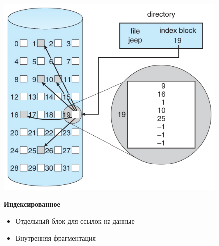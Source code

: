 \documentclass[../../lectures.tex]{subfiles}
\begin{document}
\begin{figure}[H]
\captionsetup{singlelinecheck=off}
\begin{minipage}[c]{0.5\linewidth}
\centering
\includegraphics[width=\textwidth]{images/indexed-allocation.jpg}
\end{minipage}
\hspace{0.5cm}
\begin{minipage}[c]{0.5\linewidth}
\centering
\textbf{Индексированное}
\begin{itemize}
    \item Отдельный блок для ссылок на данные
    \item Внутренняя фрагментация
\end{itemize}
\end{minipage}
\end{figure}
\end{document}
